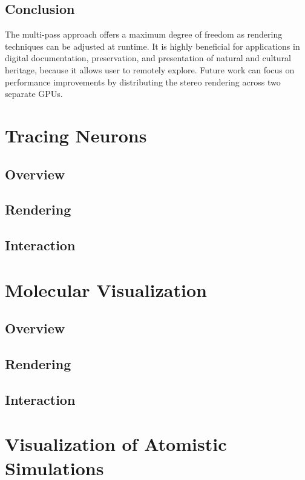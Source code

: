 \documentclass[10pt,twocolumn,letterpaper]{article}
\begin{document}
\subsection{Conclusion}
The multi-pass approach offers a maximum degree of freedom as rendering techniques can be adjusted at runtime. It is highly beneficial for applications in digital documentation, preservation, and presentation of natural and cultural heritage, because it allows user to remotely explore. Future work can focus on performance improvements by distributing the stereo rendering across two separate GPUs.
\section{Tracing Neurons}
\subsection{Overview}
\subsection{Rendering}
\subsection{Interaction}

\section{Molecular Visualization}
\subsection{Overview}
\subsection{Rendering}
\subsection{Interaction}
\cleardoublepage
\section{Visualization of Atomistic Simulations}
\end{document}
